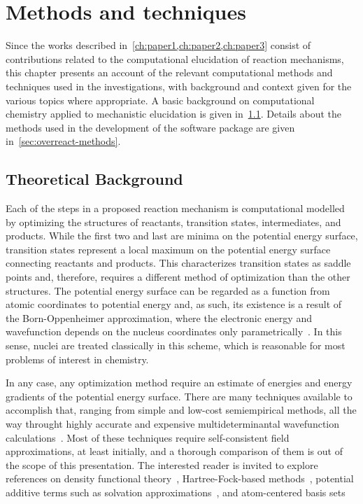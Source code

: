 \chapter{Methods and techniques}%
\label{ch:methods}

Since the works described in~\cref{ch:paper1,ch:paper2,ch:paper3} consist
of contributions related to the computational elucidation of reaction mechanisms,
this chapter presents an account of the relevant computational methods and
techniques used in the investigations,
with background and context given
for the various topics where appropriate.
A basic background on computational chemistry applied
to mechanistic elucidation is given in~\cref{sec:background-methods}.
Details about the methods used in the development of the \overreact software
package are given in~\cref{sec:overreact-methods}.

\section{Theoretical Background}%
\label{sec:background-methods}

Each of the steps in a proposed reaction mechanism is computational modelled
by optimizing the structures of reactants,
transition states,
intermediates,
and products.
While the first two and last are minima on the potential energy surface,
transition
states represent a local maximum on the potential energy surface connecting
reactants and products.
This characterizes transition states as saddle points and,
therefore,
requires
a different method of optimization than the other structures.
The potential energy surface can be regarded as a function from atomic coordinates to potential energy and,
as such,
its existence is a result of the Born-Oppenheimer approximation,
where the electronic energy and wavefunction depends on the nucleus coordinates
only parametrically~\cite{Born_1927}.
In this sense,
nuclei are treated classically in this scheme,
which is reasonable for most problems of interest in chemistry.

In any case,
any optimization method require an estimate of energies and energy gradients
of the potential energy surface.
There are many techniques available to accomplish that,
ranging from simple and low-cost semiempirical methods,
all the way throught highly accurate and expensive multideterminantal wavefunction calculations~\cite{Perdew_2001}.
Most of these techniques require self-consistent field approximations,
at least initially,
and a thorough comparison of them is out of the scope of this presentation.
The interested reader is invited to explore
references on density functional theory~\cite{Hohenberg_1964,Kohn_1965,Chai_2008a,Chai_2008b,Goerigk_2011,Arago_2011,Salzner_2011,Burns_2011,Minenkov_2012,Perdew_2014,Kryachko_2014,Yu_2016,DFT2016_poll},
Hartree-Fock-based methods~\cite{Szabo_1996},
potential additive terms such as solvation approximations~\cite{Marenich_2009,Marenich_2012},
and atom-centered basis sets~\cite{Ditchfield_1971,Hehre_1972,Hariharan_1973,Hariharan_1974,Gordon_1980,Francl_1982,Clark_1983,Frisch_1984,Binning_1990,Szabo_1996,Helgaker_1997,Blaudeau_1997,Rassolov_1998,Rassolov_2001,Jensen_2012,Hill_2012}

